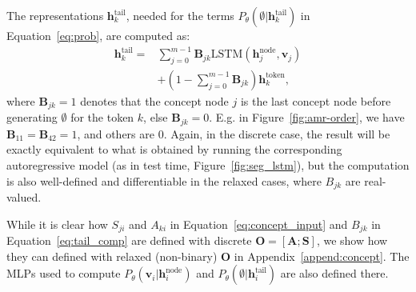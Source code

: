 \documentclass[11pt]{article}
\begin{document}
The representations $\mathbf{h}^{\mathrm{tail}}_k$,
needed for the terms
$P_\theta(\emptyset |\mathbf{h}^{\mathrm{tail}}_k)$ 
in Equation~\ref{eq:prob}, are computed as:
\begin{align}
\nonumber
 \mathbf{h}^{\mathrm{tail}}_k = &
  \sum_{j=0}^{m-1}  \mathbf{B}_{jk}\mathrm{LSTM}{(\mathbf{h}^{\mathrm{node}}_j,\mathbf{v}_j)} \\
      & +  (1 - \sum_{j=0}^{m-1}{ \mathbf{B}_{jk} })
     \mathbf{h}^{\mathrm{token}}_k, \label{eq:tail_comp}
\end{align}
where $\mathbf{B}_{jk}=1$  denotes that the concept node $j$ is the last concept node before generating $\emptyset$ for the token $k$, else $\mathbf{B}_{jk}=0$. E.g. in Figure~\ref{fig:amr-order}, we have $\mathbf{B}_{11}=\mathbf{B}_{42}=1$, and others are 0.
Again, in the discrete case, the result will be exactly equivalent to what is obtained by running the corresponding autoregressive model (as in test time,   Figure~\ref{fig:seg_lstm}), but the computation is also well-defined and differentiable in the relaxed cases, where $B_{jk}$ are real-valued.








While it is clear how $S_{ji}$ and $A_{ki}$ in Equation~\ref{eq:concept_input} and $B_{jk}$ in Equation~\ref{eq:tail_comp} are defined with discrete $\mathbf{O}= [\mathbf{A}; \mathbf{S}]$, we show
how they can defined with relaxed (non-binary) $\mathbf{O}$ in Appendix~\ref{append:concept}. The MLPs used to compute $P_\theta(\mathbf{v}_i|\mathbf{h}^{\mathrm{node}}_i) $ and $P_\theta(\emptyset|\mathbf{h}^{\mathrm{tail}}_i)$ are also defined there. 
\end{document}
